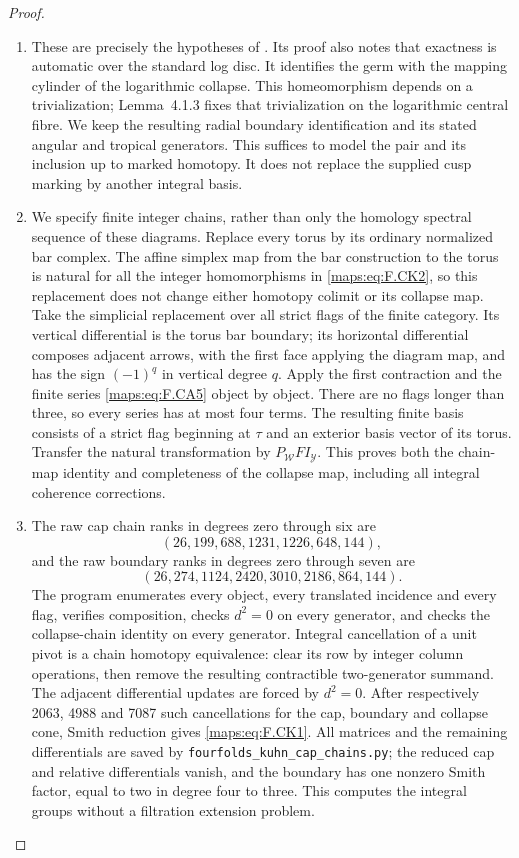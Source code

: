 \begin{proof}
\begin{enumerate}[label=\arabic*.]
\item These are precisely the hypotheses of
\cite[Theorem~4.1.1, pp.~480--482]{ffAchingerOgus20}.
Its proof also notes that exactness is automatic over the
standard log disc.  It identifies the germ with the mapping
cylinder of the logarithmic collapse.  This homeomorphism
depends on a trivialization; Lemma~4.1.3 fixes that
trivialization on the logarithmic central fibre.  We keep
the resulting radial boundary identification and its stated
angular and tropical generators.  This suffices to model
the pair and its inclusion up to marked homotopy.  It does
not replace the supplied cusp marking by another integral
basis.

\item We specify finite integer chains, rather than only the
homology spectral sequence of these diagrams.  Replace every
torus by its ordinary normalized bar complex.  The affine
simplex map from the bar construction to the torus is natural
for all the integer homomorphisms in \eqref{maps:eq:F.CK2}, so this replacement
does not change either homotopy colimit or its collapse map.
Take the simplicial replacement over all strict flags of the
finite category.  Its vertical differential is the torus bar
boundary; its horizontal differential composes adjacent
arrows, with the first face applying the diagram map, and
has the sign $(-1)^q$ in vertical degree $q$.
Apply the first contraction and the finite series \eqref{maps:eq:F.CA5}
object by object.  There are no flags longer than three,
so every series has at most four terms.  The resulting
finite basis consists of a strict flag beginning at $\tau$
and an exterior basis vector of its torus.  Transfer the
natural transformation by $P_{\mathcal W}FI_{\mathcal Y}$.
This proves both the chain-map identity and completeness of
the collapse map, including all integral coherence corrections.

\item The raw cap chain ranks in degrees zero through six are
\[
 (26,199,688,1231,1226,648,144),
\]
and the raw boundary ranks in degrees zero through seven are
\[
 (26,274,1124,2420,3010,2186,864,144).
\]
The program enumerates every object, every translated
incidence and every flag, verifies composition, checks
$d^2=0$ on every generator, and checks the collapse-chain
identity on every generator.  Integral cancellation of a
unit pivot is a chain homotopy equivalence: clear its row by
integer column operations, then remove the resulting
contractible two-generator summand.  The adjacent differential
updates are forced by $d^2=0$.  After respectively 2063,
4988 and 7087 such cancellations for the cap, boundary and
collapse cone, Smith reduction gives \eqref{maps:eq:F.CK1}.  All matrices
and the remaining differentials are saved by
\texttt{fourfolds\_kuhn\_cap\_chains.py}; the reduced cap and
relative differentials vanish, and the boundary has one
nonzero Smith factor, equal to two in degree four to three.
This computes the integral groups without a filtration
extension problem.
\end{enumerate}
\end{proof}


